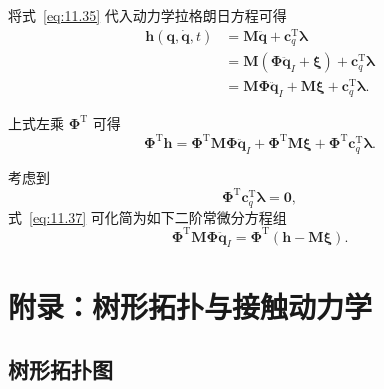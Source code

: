 将式~\eqref{eq:11.35} 代入动力学拉格朗日方程可得
\begin{equation}\label{eq:11.36}
\begin{aligned}
\boldsymbol{h}(\boldsymbol{q}, \dot{\boldsymbol{q}}, t) &= \boldsymbol{M} \ddot{\boldsymbol{q}} + \boldsymbol{c}_{q}^{\mathrm{T}} \boldsymbol{\lambda} \\
&= \boldsymbol{M} (\boldsymbol{\Phi} \ddot{\boldsymbol{q}}_I + \boldsymbol{\xi}) + \boldsymbol{c}_{q}^{\mathrm{T}} \boldsymbol{\lambda} \\
&= \boldsymbol{M} \boldsymbol{\Phi} \ddot{\boldsymbol{q}}_I + \boldsymbol{M} \boldsymbol{\xi} + \boldsymbol{c}_{q}^{\mathrm{T}} \boldsymbol{\lambda}.
\end{aligned}
\end{equation}

上式左乘 $\boldsymbol{\Phi}^{\mathrm{T}}$ 可得
\begin{equation}\label{eq:11.37}
\boldsymbol{\Phi}^{\mathrm{T}} \boldsymbol{h} = \boldsymbol{\Phi}^{\mathrm{T}} \boldsymbol{M} \boldsymbol{\Phi} \ddot{\boldsymbol{q}}_I + \boldsymbol{\Phi}^{\mathrm{T}} \boldsymbol{M} \boldsymbol{\xi} + \boldsymbol{\Phi}^{\mathrm{T}} \boldsymbol{c}_{q}^{\mathrm{T}} \boldsymbol{\lambda}.
\end{equation}

考虑到
\begin{equation}\label{eq:11.38}
\boldsymbol{\Phi}^{\mathrm{T}} \boldsymbol{c}_{q}^{\mathrm{T}} \boldsymbol{\lambda} = \boldsymbol{0},
\end{equation}
式~\eqref{eq:11.37} 可化简为如下二阶常微分方程组
\begin{equation}\label{eq:11.39}
\boxed{\boldsymbol{\Phi}^{\mathrm{T}} \boldsymbol{M} \boldsymbol{\Phi} \ddot{\boldsymbol{q}}_I = \boldsymbol{\Phi}^{\mathrm{T}} \left( \boldsymbol{h} - \boldsymbol{M} \boldsymbol{\xi} \right)}.
\end{equation}


\section*{附录：树形拓扑与接触动力学}

\subsection{树形拓扑图}

